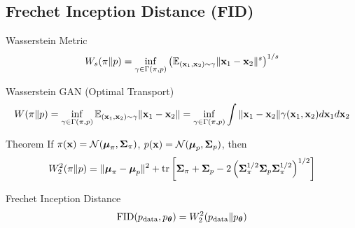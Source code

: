 \documentclass{beamer}
\renewcommand{\eqpause}{}
\begin{document}
\subsection{Frechet Inception Distance (FID)}
\begin{frame}{Wasserstein Metric}
	\vspace{-0.2cm}
	\[
		W_s(\pi \| p) = \inf_{\gamma \in \Gamma(\pi, p)} \left(\mathbb{E}_{(\mathbf{x}_1, \mathbf{x}_2) \sim \gamma} \| \mathbf{x}_1 - \mathbf{x}_2 \|^s\right)^{1/s}
	\]
	\eqpause
	\vspace{-0.3cm}
	\begin{block}{Wasserstein GAN (Optimal Transport)}
		\vspace{-0.5cm}
		{\small
		\[
			W(\pi \| p) = \inf_{\gamma \in \Gamma(\pi, p)} \mathbb{E}_{(\mathbf{x}_1, \mathbf{x}_2) \sim \gamma} \| \mathbf{x}_1 - \mathbf{x}_2 \| =  \inf_{\gamma\in {\Gamma(\pi, p)}} \int { \| \mathbf{x}_1 - \mathbf{x}_2 \|} {\gamma (\mathbf{x}_1, \mathbf{x}_2)} d \mathbf{x}_1 d \mathbf{x}_2
		\]
		}
		\vspace{-0.5cm}
	\end{block}
	\eqpause
	\begin{block}{Theorem}
		If $\pi(\mathbf{x}) = \mathcal{N}(\boldsymbol{\mu}_\pi, \boldsymbol{\Sigma}_\pi)$, $p(\mathbf{x}) = \mathcal{N}(\boldsymbol{\mu}_p, \boldsymbol{\Sigma}_p)$, then
		\vspace{-0.2cm}
		\[
			W_2^2(\pi \| p) = \| \boldsymbol{\mu}_{\pi} - \boldsymbol{\mu}_{p}\|^2 + \text{tr} \left[ \boldsymbol{\Sigma}_{\pi} + \boldsymbol{\Sigma}_p - 2 \left(\boldsymbol{\Sigma}_{\pi}^{1/2} \boldsymbol{\Sigma}_p \boldsymbol{\Sigma}_{\pi}^{1/2} \right)^{1/2} \right]
		\]
		\vspace{-0.7cm}
	\end{block}
	\eqpause
	\begin{block}{Frechet Inception Distance}
		\vspace{-0.3cm}
		\[
			\mathrm{FID} (p_{\text{data}}, p_{\boldsymbol{\theta}}) =  W_2^2(p_{\text{data}} \| p_{\boldsymbol{\theta}})
		\]
		\vspace{-0.6cm}
	\end{block}
\end{frame}
\end{document}
